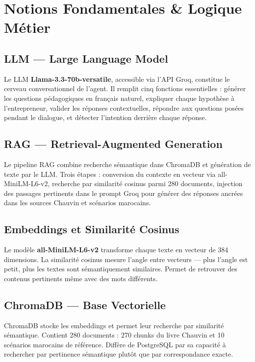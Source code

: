 \documentclass[12pt, a4paper]{report}
\begin{document}
\chapter{Notions Fondamentales \& Logique Métier}

\section{LLM — Large Language Model}

Le LLM \textbf{Llama-3.3-70b-versatile}, accessible via l'API Groq, constitue le cerveau conversationnel de l'agent. Il remplit cinq fonctions essentielles : générer les questions pédagogiques en français naturel, expliquer chaque hypothèse à l'entrepreneur, valider les réponses contextuelles, répondre aux questions posées pendant le dialogue, et détecter l'intention derrière chaque réponse.

\section{RAG — Retrieval-Augmented Generation}

Le pipeline RAG combine recherche sémantique dans ChromaDB et génération de texte par le LLM. Trois étapes : conversion du contexte en vecteur via all-MiniLM-L6-v2, recherche par similarité cosinus parmi 280 documents, injection des passages pertinents dans le prompt Groq pour générer des réponses ancrées dans les sources Chauvin et scénarios marocains.

\section{Embeddings et Similarité Cosinus}

Le modèle \textbf{all-MiniLM-L6-v2} transforme chaque texte en vecteur de 384 dimensions. La similarité cosinus mesure l'angle entre vecteurs — plus l'angle est petit, plus les textes sont sémantiquement similaires. Permet de retrouver des contenus pertinents même avec des mots différents.

\section{ChromaDB — Base Vectorielle}

ChromaDB stocke les embeddings et permet leur recherche par similarité sémantique. Contient 280 documents : 270 chunks du livre Chauvin et 10 scénarios marocains de référence. Diffère de PostgreSQL par sa capacité à rechercher par pertinence sémantique plutôt que par correspondance exacte.
\end{document}
